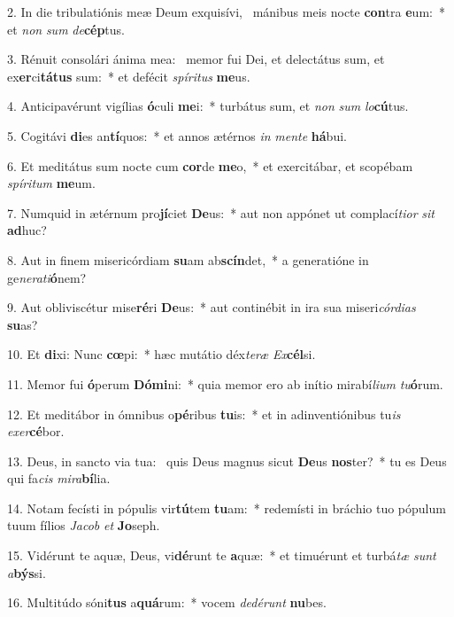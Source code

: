 2. In die tribulatiónis meæ Deum exquisívi, \dag\  mánibus meis nocte \textbf{con}tra \textbf{e}um:~*  et \textit{non} \textit{sum} \textit{de}\textbf{cép}tus.\

3. Rénuit consolári ánima mea: \dag\  memor fui Dei, et delectátus sum, et ex\textbf{er}ci\textbf{tá}\textbf{tus} sum:~*  et defécit \textit{spí}\textit{ri}\textit{tus} \textbf{me}us.\

4. Anticipavérunt vigílias \textbf{ó}culi \textbf{me}i:~*  turbátus sum, et \textit{non} \textit{sum} \textit{lo}\textbf{cú}tus.\

5. Cogitávi \textbf{di}es an\textbf{tí}quos:~*  et annos ætérnos \textit{in} \textit{men}\textit{te} \textbf{há}bui.\

6. Et meditátus sum nocte cum \textbf{cor}de \textbf{me}o,~*  et exercitábar, et scopébam \textit{spí}\textit{ri}\textit{tum} \textbf{me}um.\

7. Numquid in ætérnum pro\textbf{jí}ciet \textbf{De}us:~*  aut non appónet ut complací\textit{ti}\textit{or} \textit{sit} \textbf{ad}huc?\

8. Aut in finem misericórdiam \textbf{su}am ab\textbf{scín}det,~*  a generatióne in ge\textit{ne}\textit{ra}\textit{ti}\textbf{ó}nem?\

9. Aut obliviscétur mise\textbf{ré}ri \textbf{De}us:~*  aut continébit in ira sua miseri\textit{cór}\textit{di}\textit{as} \textbf{su}as?\

10. Et \textbf{di}xi: Nunc \textbf{cœ}pi:~*  hæc mutátio déx\textit{te}\textit{ræ} \textit{Ex}\textbf{cél}si.\

11. Memor fui \textbf{ó}perum \textbf{Dó}\textbf{mi}ni:~*  quia memor ero ab inítio mirabí\textit{li}\textit{um} \textit{tu}\textbf{ó}rum.\

12. Et meditábor in ómnibus o\textbf{pé}ribus \textbf{tu}is:~*  et in adinventiónibus tu\textit{is} \textit{ex}\textit{er}\textbf{cé}bor.\

13. Deus, in sancto via tua: \dag\  quis Deus magnus sicut \textbf{De}us \textbf{nos}ter?~*  tu es Deus qui fa\textit{cis} \textit{mi}\textit{ra}\textbf{bí}lia.\

14. Notam fecísti in pópulis vir\textbf{tú}tem \textbf{tu}am:~*  redemísti in bráchio tuo pópulum tuum fílios \textit{Ja}\textit{cob} \textit{et} \textbf{Jo}seph.\

15. Vidérunt te aquæ, Deus, vi\textbf{dé}runt te \textbf{a}quæ:~*  et timuérunt et turbá\textit{tæ} \textit{sunt} \textit{a}\textbf{býs}si.\

16. Multitúdo sóni\textbf{tus} a\textbf{quá}rum:~*  vocem \textit{de}\textit{dé}\textit{runt} \textbf{nu}bes.\

